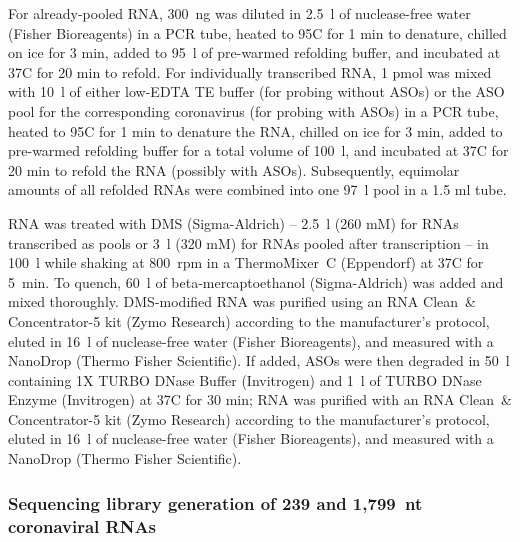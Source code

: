 \documentclass[main.tex]{subfiles}
\begin{document}
For already-pooled RNA, 300~ng was diluted in 2.5~\textmu l of nuclease-free water (Fisher Bioreagents) in a PCR tube, heated to 95\textdegree C for 1 min to denature, chilled on ice for 3 min, added to 95~\textmu l of pre-warmed refolding buffer, and incubated at 37\textdegree C for 20 min to refold.
For individually transcribed RNA, 1 pmol was mixed with 10~\textmu l of either low-EDTA TE buffer (for probing without ASOs) or the ASO pool for the corresponding coronavirus (for probing with ASOs) in a PCR tube, heated to 95\textdegree C for 1 min to denature the RNA, chilled on ice for 3 min, added to pre-warmed refolding buffer for a total volume of 100~\textmu l, and incubated at 37\textdegree C for 20 min to refold the RNA (possibly with ASOs).
Subsequently, equimolar amounts of all refolded RNAs were combined into one 97~\textmu l pool in a 1.5 ml tube.

RNA was treated with DMS (Sigma-Aldrich) -- 2.5~\textmu l (260 mM) for RNAs transcribed as pools or 3~\textmu l (320 mM) for RNAs pooled after transcription -- in 100~\textmu l while shaking at 800~rpm in a ThermoMixer~C (Eppendorf) at 37\textdegree C for 5~min.
To quench, 60~\textmu l of beta-mercaptoethanol (Sigma-Aldrich) was added and mixed thoroughly.
DMS-modified RNA was purified using an RNA Clean~\& Concentrator-5 kit (Zymo Research) according to the manufacturer's protocol, eluted in 16~\textmu l of nuclease-free water (Fisher Bioreagents), and measured with a NanoDrop (Thermo Fisher Scientific).
If added, ASOs were then degraded in 50~\textmu l containing 1X TURBO DNase Buffer (Invitrogen) and 1~\textmu l of TURBO DNase Enzyme (Invitrogen) at 37\textdegree C for 30 min; RNA was purified with an RNA Clean~\& Concentrator-5 kit (Zymo Research) according to the manufacturer's protocol, eluted in 16~\textmu l of nuclease-free water (Fisher Bioreagents), and measured with a NanoDrop (Thermo Fisher Scientific).

\subsubsection{Sequencing library generation of 239 and 1,799~nt coronaviral RNAs}
\label{xgen_library}
\end{document}
